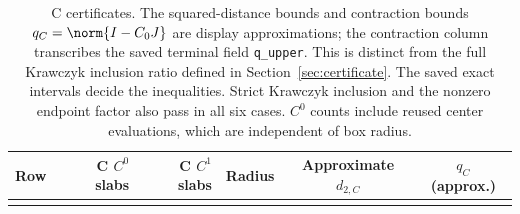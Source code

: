 \begin{longtable}{@{}rrrccc@{}}
\toprule
Row & C $C^0$ slabs & C $C^1$ slabs & Radius & Approximate $d_{2,C}$ & $q_C$ (approx.)\\
\midrule
\bottomrule
\caption{C certificates. The squared-distance bounds and contraction
bounds $q_C=\norm{I-C_0J}$ are display approximations; the contraction
column transcribes the saved terminal field \texttt{q\_upper}. This is
distinct from the full Krawczyk inclusion ratio defined in
Section~\ref{sec:certificate}. The saved exact intervals decide the
inequalities. Strict Krawczyk inclusion and the
nonzero endpoint factor also pass in all six cases. $C^0$ counts
include reused center evaluations, which are independent of box radius.}
\label{tab:capd}
\end{longtable}
